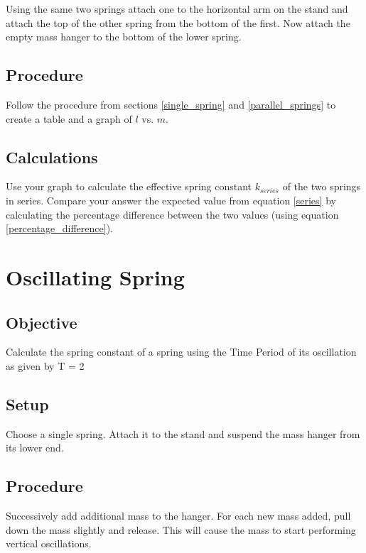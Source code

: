         Using the same two springs attach one to the horizontal arm on the stand and attach the top of the other spring from the bottom of the first. Now attach the empty mass hanger to the bottom of the lower spring.

    \subsection*{Procedure}

        Follow the procedure from sections \ref{single_spring} and \ref{parallel_springs} to create a table and a graph of $l$ vs. $m$.

    \subsection*{Calculations}

        Use your graph to calculate the effective spring constant $k_{series}$ of the two springs in series. Compare your answer the expected value from equation \eqref{series} by calculating the percentage difference between the two values (using equation \eqref{percentage_difference}).


\section{Oscillating Spring}

    \subsection*{Objective}

        Calculate the spring constant of a spring using the Time Period of its oscillation as given by
        \beq \label{time_period}
            T = 2 \pi {}
        \eeq

    \subsection*{Setup}

        Choose a single spring. Attach it to the stand and suspend the mass hanger from its lower end.

    \subsection*{Procedure}

        Successively add additional mass to the hanger. For each new mass added, pull down the mass slightly and release. This will cause the mass to start performing vertical oscillations.

